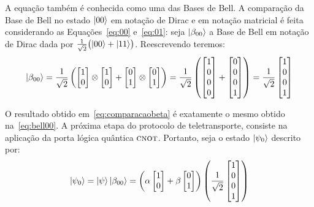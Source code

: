 A equação também é conhecida como uma das Bases de Bell. A comparação da Base de Bell no estado $\ket{00}$ em notação de Dirac e em notação matricial é feita considerando as Equações~\eqref{eq:00} e~\eqref{eq:01}: seja \(\ket{\beta_{00}}\) a Base de Bell em notação de Dirac dada por \(\frac{1}{\sqrt{2}} \bigl(\ket{00} + \ket{11}\bigr)\). Reescrevendo teremos:
\begin{equation}\label{eq:comparacaobeta}
\ket{\beta_{00}} = \frac{1}{\sqrt{2}} \left( \begin{bmatrix}
1 \\
0
\end{bmatrix} \otimes \begin{bmatrix}
1 \\
0
\end{bmatrix} + \begin{bmatrix}
0 \\
1
\end{bmatrix} \otimes \begin{bmatrix}
0 \\
1
\end{bmatrix}\right) = \frac{1}{\sqrt{2}} \left( \begin{bmatrix}
1 \\
0 \\
0 \\
0 
\end{bmatrix} + \begin{bmatrix}
0 \\
0 \\
0 \\
1 
\end{bmatrix}\right) = \frac{1}{\sqrt{2}} \begin{bmatrix}
1 \\
0 \\
0 \\
1 
\end{bmatrix}
\end{equation}

O resultado obtido em~\eqref{eq:comparacaobeta} é exatamente o mesmo obtido na~\eqref{eq:bell00}. A próxima etapa do protocolo de teletransporte, consiste na aplicação da porta lógica quântica \(\operatorname{\textsc{cnot}}\). Portanto, seja o estado $\ket{\psi_0}$ descrito por:
\begin{equation}\label{eq:psi0}
\ket{\psi_0}=\ket{\psi}\ket{\beta_{00}}=\left(\alpha \begin{bmatrix}
1 \\
0 
\end{bmatrix} + \beta \begin{bmatrix}
0 \\
1
\end{bmatrix}\right) \left(\frac{1}{\sqrt{2}} \begin{bmatrix}
1 \\
0 \\
0 \\
1
\end{bmatrix}\right)
\end{equation}

